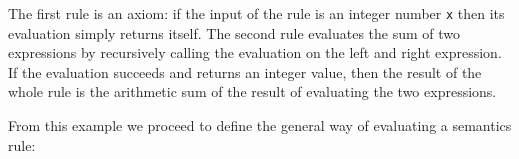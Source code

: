 The first rule is an axiom: if the input of the rule is an integer number \texttt{x} then its evaluation simply returns itself. The second rule evaluates the sum of two expressions by recursively calling the evaluation on the left and right expression. If the evaluation succeeds and returns an integer value, then the result of the whole rule is the arithmetic sum of the result of evaluating the two expressions.

From this example we proceed to define the general way of evaluating a semantics rule:

